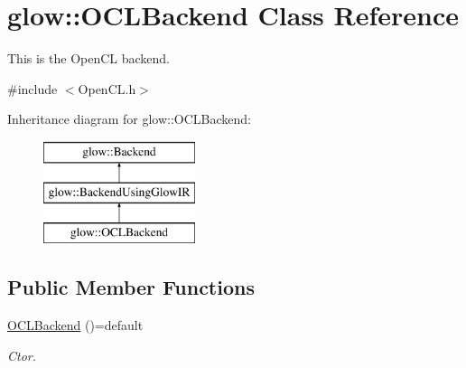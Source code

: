 \hypertarget{classglow_1_1_o_c_l_backend}{}\section{glow\+:\+:O\+C\+L\+Backend Class Reference}
\label{classglow_1_1_o_c_l_backend}


This is the Open\+CL backend.  




{\ttfamily \#include $<$Open\+C\+L.\+h$>$}

Inheritance diagram for glow\+:\+:O\+C\+L\+Backend\+:\begin{figure}[H]
\begin{center}
\leavevmode
\includegraphics[height=3.000000cm]{classglow_1_1_o_c_l_backend}
\end{center}
\end{figure}
\subsection*{Public Member Functions}
\begin{DoxyCompactItemize}
\item 
\mbox{\label{classglow_1_1_o_c_l_backend_a5e1088ba943adf8081ba4043627fc81b}} 
\hyperlink{classglow_1_1_o_c_l_backend_a5e1088ba943adf8081ba4043627fc81b}{O\+C\+L\+Backend} ()=default
\begin{DoxyCompactList}\small\item\em Ctor. \end{DoxyCompactList}\end{DoxyCompactItemize}
